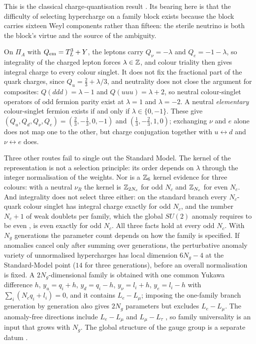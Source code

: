 This is the classical charge-quantisation result \cite{FootLewVolkas,GengMarshak}. Its bearing here is that the difficulty of selecting
hypercharge on a family block exists because the block carries sixteen Weyl components rather than fifteen: the sterile neutrino is both
the block's virtue and the source of the ambiguity.

\begin{proposition}
\label{prop:integrality}
On $\Pi_A$ with $Q_{\rm em}=T^3_L+Y$, the leptons carry $Q_\nu=-\lambda$ and $Q_e=-1-\lambda$, so integrality of the charged lepton forces
$\lambda\in\mathbb{Z}$, and colour triality then gives integral charge to every colour singlet. It does not fix the fractional part of the quark
charges, since $Q_u=\tfrac23+\lambda/3$, and neutrality does not close the argument for composites: $Q(ddd)=\lambda-1$ and $Q(uuu)=\lambda+2$, so
neutral colour-singlet operators of odd fermion parity exist at $\lambda=1$ and $\lambda=-2$. A neutral \emph{elementary} colour-singlet
fermion exists if and only if $\lambda\in\{0,-1\}$. These give $(Q_u,Q_d,Q_\nu,Q_e)=(\tfrac23,-\tfrac13,0,-1)$ and $(\tfrac13,-\tfrac23,1,0)$;
exchanging $\nu$ and $e$ alone does not map one to the other, but charge conjugation together with $u\leftrightarrow d$ and
$\nu\leftrightarrow e$ does.
\end{proposition}

Three other routes fail to single out the Standard Model. The kernel of the representation is not a selection principle: its order
depends on $\lambda$ through the integer normalisation of the weights. Nor is a $\mathbb{Z}_6$ kernel evidence for three colours: with a neutral
$\nu_R$ the kernel is $\mathbb{Z}_{2N_c}$ for odd $N_c$ and $\mathbb{Z}_{N_c}$ for even $N_c$. And integrality does not select three either: on the standard
branch every $N_c$-quark colour singlet has integral charge exactly for odd $N_c$, and the number $N_c+1$ of weak doublets per family, which
the global $SU(2)$ anomaly requires to be even \cite{Witten82}, is even exactly for odd $N_c$. All three facts hold at every odd $N_c$. With
$N_g$ generations the parameter count depends on how the family is specified. If anomalies cancel only after summing over generations, the
perturbative anomaly variety of unnormalised hypercharges has local dimension $6N_g-4$ at the Standard-Model point ($14$ for three
generations), before an overall normalisation is fixed. A $2N_g$-dimensional family is obtained
with one common Yukawa difference $h$, $y_u=q_i+h$, $y_d=q_i-h$, $y_\nu=l_i+h$, $y_e=l_i-h$ with $\sum_i(N_cq_i+l_i)=0$, and it contains $L_e-L_\mu$;
imposing the one-family branch generation by generation also gives $2N_g$ parameters but excludes $L_e-L_\mu$. The anomaly-free directions
include $L_e-L_\mu$ and $L_\mu-L_\tau$ \cite{HeJoshiLewVolkas}, so family universality is an input that grows with $N_g$. The global structure of the gauge group is a separate
datum \cite{Tong,GaiottoKapustinSeibergWillett}.

